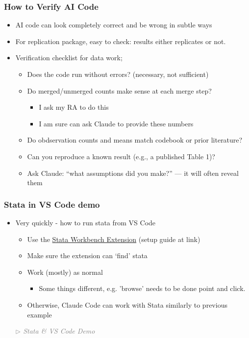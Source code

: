 \documentclass[aspectratio=169, 12pt]{beamer}
\begin{document}
\begin{frame}
\frametitle{How to Verify AI Code}

\begin{itemize}
    \item AI code can look completely correct and be wrong in subtle ways
    \item For replication package, easy to check: results either replicates or not.
    \item Verification checklist for data work;
        \begin{itemize}
            \item[$\circ$] Does the code run without errors? (necessary, not sufficient)
            \item[$\circ$] Do merged/unmerged counts make sense at each merge step? 
       		 \begin{itemize}
           		\item[$\circ$] I ask my RA to do this
			\item[$\circ$] I am sure can ask Claude to provide these numbers
        		\end{itemize}
            \item[$\circ$] Do obdservation counts and means match codebook or prior literature?
            \item[$\circ$] Can you reproduce a known result (e.g., a published Table 1)?
            \item[$\circ$] Ask Claude: ``what assumptions did you make?'' --- it will often reveal them
        \end{itemize}
\end{itemize}

\end{frame}



\begin{frame}
\frametitle{Stata in VS Code demo}

\begin{itemize}
    \item Very quickly - how to run stata from VS Code
    \begin{itemize}
        \item Use the \href{https://github.com/tmonk/stata-workbench}{Stata Workbench Extension} (setup guide at link)
        \item Make sure the extension can `find' stata
        \item Work (mostly) as normal
        \begin{itemize}
            \item Some things different, e.g. 'browse' needs to be done point and click.
        \end{itemize}
    \item Otherwise, Claude Code can work with Stata similarly to previous example
    \end{itemize}
    \textcolor{gray}{\textit{$\triangleright$ Stata \& VS Code Demo}}
\end{itemize}

\end{frame}
\end{document}

